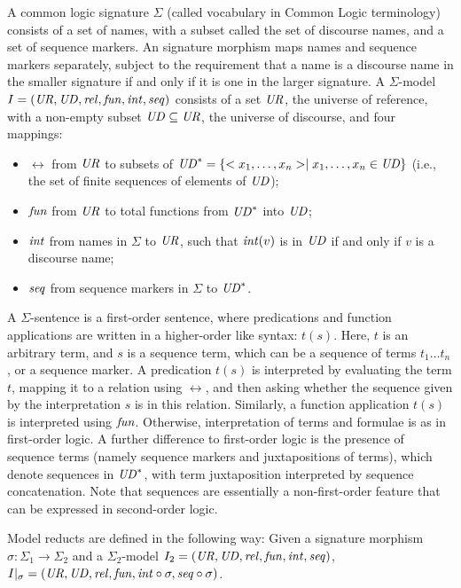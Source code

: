 \documentclass[10pt,fleqn,final]{scrreprt}
\newenvironment{definitions}[0]{\medskip }{}
\begin{document}
\begin{definitions}
\begin{definition}\label{CommonLogic}   
A common logic signature
$\Sigma$ (called vocabulary in Common Logic terminology) consists of a
set of names, with a subset called the set of discourse names, and a
set of sequence markers. An signature morphism maps
names and sequence markers separately, subject to the requirement
 that a name is a discourse
name in the smaller signature if and only if it is one in the larger signature.  A $\Sigma$-model $I=(\mathit{UR},\mathit{UD},\mathit{rel},\mathit{fun},\mathit{int},\mathit{seq})$ consists of a set $\mathit{UR}$,
the universe of reference, with a non-empty subset $\mathit{UD}\subseteq \mathit{UR}$,
the universe of discourse, and four mappings:
  \begin{itemize}
   \item $\rel$ from $\mathit{UR}$ to subsets of $\mathit{UD}^* = \{<x_1,\ldots,x_n> \mid
x_1,\ldots,x_n \in \mathit{UD}\}$ (i.e., the set of finite sequences of
elements of $\mathit{UD}$);
   \item $\mathit{fun}$ from $\mathit{UR}$ to total functions from $\mathit{UD}^*$ into $\mathit{UD}$;
   \item $\mathit{int}$ from names in $\Sigma$ to $\mathit{UR}$, such that
$\mathit{int}(v)$ is in $\mathit{UD}$ if and only if $v$ is a discourse name;
   \item $\mathit{seq}$ from sequence markers in $\Sigma$ to $\mathit{UD}^*$.
  \end{itemize}  A $\Sigma$-sentence is a first-order
sentence, where predications and function applications are written
in a higher-order like syntax: $t(s)$.
Here, $t$ is an arbitrary term, and $s$ is a sequence term, which can
be a sequence of terms $t_1\ldots t_n$, or a sequence marker.
A predication $t(s)$ is interpreted by evaluating the term $t$,
mapping it to a relation using $\rel$, and then asking whether the sequence
given by the interpretation $s$ is in this relation.  
Similarly, a function application $t(s)$ is interpreted using $\mathit{fun}$.
Otherwise, interpretation of terms and formulae is as in
first-order logic. 
A further
difference to first-order logic
is the presence of sequence terms (namely sequence markers and
juxtapositions of terms), which denote sequences in $\mathit{UD}^*$, with term
juxtaposition interpreted by sequence concatenation.
Note that sequences are essentially a non-first-order feature that
can be expressed in second-order logic.

Model reducts are defined in the following way: 
Given a signature morphism $\sigma:\Sigma_1\to\Sigma_2$ and a $\Sigma_2$-model
$I_2=(\mathit{UR},\mathit{UD},\mathit{rel},\mathit{fun},\mathit{int},\mathit{seq})$, $I|_{\sigma}=(\mathit{UR},\mathit{UD},\mathit{rel},\mathit{fun},\mathit{int}\circ\sigma,\mathit{seq}\circ\sigma)$. 


\end{definition}
\end{definitions}
\end{document}
